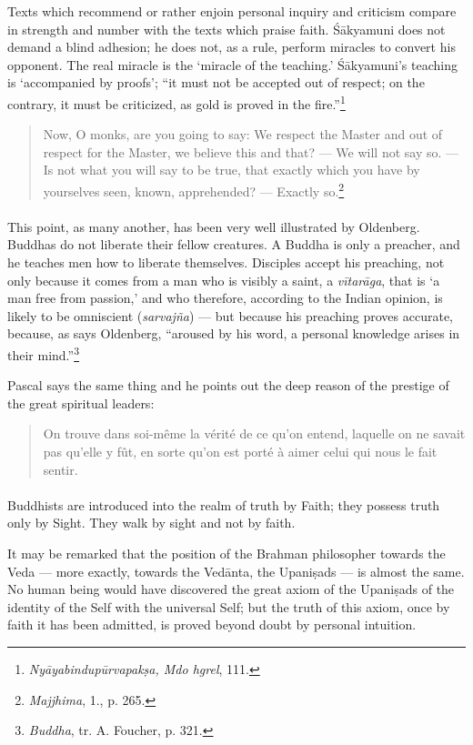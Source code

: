 \documentclass[a4paper, 11pt, oneside, english]{article}
\begin{document}
Texts which recommend or rather enjoin personal inquiry and criticism compare in strength and number with the texts which praise faith. Śākyamuni does not demand a blind adhesion; he does not, as a rule, perform miracles to convert his opponent. The real miracle is the `miracle of the teaching.' Śākyamuni's teaching is `accompanied by proofs'; ``it must not be accepted out of respect; on the contrary, it must be criticized, as gold is proved in the fire.''\footnote{\emph{Nyāyabindupūrvapakṣa, Mdo hgrel}, 111.}
\begin{quotation}
\small
Now, O monks, are you going to say: We respect the Master and out of respect for the Master, we believe this and that? --- We will not say so. --- Is not what you will say to be true, that exactly which you have by yourselves seen, known, apprehended? --- Exactly so.\footnote{\emph{Majjhima}, 1., p. 265.}
\end{quotation}
\paragraph{}
This point, as many another, has been very well illustrated by Oldenberg. Buddhas do not liberate their fellow creatures. A Buddha is only a preacher, and he teaches men how to liberate themselves. Disciples accept his preaching, not only because it comes from a man who is visibly a saint, a \emph{vītarāga}, that is `a man free from passion,' and who therefore, according to the Indian opinion, is likely to be omniscient (\emph{sarvajña}) --- but because his preaching proves accurate, because, as says Oldenberg, ``aroused by his word, a personal knowledge arises in their mind.''\footnote{\emph{Buddha}, tr. A. Foucher, p. 321.}

Pascal says the same thing and he points out the deep reason of the prestige of the great spiritual leaders:
\begin{quotation}
\small
On trouve dans soi-même la vérité de ce qu'on entend, laquelle on ne savait pas qu'elle y fût, en sorte qu'on est porté à aimer celui qui nous le fait sentir.
\end{quotation}
\paragraph{}
Buddhists are introduced into the realm of truth by Faith; they possess truth only by Sight. They walk by sight and not by faith.

It may be remarked that the position of the Brahman philosopher towards the Veda --- more exactly, towards the Vedānta, the Upaniṣads --- is almost the same. No human being would have discovered the great axiom of the Upaniṣads of the identity of the Self with the universal Self; but the truth of this axiom, once by faith it has been admitted, is proved beyond doubt by personal intuition.
\end{document}
